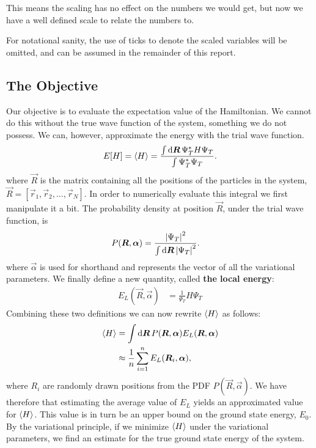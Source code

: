 \documentclass[a4paper, 11pt]{article}
\begin{document}
\begin{multicols}{2}
This means the scaling has no effect on the numbers we would get, but now we
have a well defined scale to relate the numbers to.

For notational sanity, the use of ticks to denote the scaled variables will be
omitted, and can be assumed in the remainder of this report. 



\subsection{The Objective}
Our objective is to evaluate the expectation value of the Hamiltonian. We cannot do this
without the true wave function of the system, something we do not possess.
We can, however, approximate the energy with the trial wave function.
\begin{align}
    E[H] = \expval{H} = \frac{\int \dd{\bm R} \Psi^*_T H \Psi_T}{\int
    \Psi_T^*\Psi_T}.
\end{align}
where $\vec R$ is the matrix containing all the positions of the particles in
the system, $\vec R = [\vec r_1, \vec r_2, \dots, \vec r_N]$.
In order to numerically evaluate this integral we first manipulate it a bit.
The probability density at position $\vec R$, under the trial wave function, is
\begin{align}
    P(\bm R, \bm \alpha) &= \frac{\abs{\Psi_T}^2}{\int \dd{\bm R}\abs{\Psi_T}^2}.
\end{align}
where $\vec \alpha$ is used for shorthand and represents the vector of all the variational parameters.
We finally define a new quantity, called \textbf{the local energy}:
\begin{align}
    E_L(\vec R, \vec \alpha) &= \frac{1}{\Psi_T}H\Psi_T\label{eq:E_L}
\end{align}
Combining these two definitions we can now rewrite $\expval{H}$ as follows:
\begin{align}
    \begin{split}
        \expval{H} &= \int \dd{\bm R} P(\bm R,\bm\alpha) E_L(\bm R,\bm\alpha)\\
        &\approx
        \frac{1}{n}\sum_{i=1}^n E_L(\bm R_i,\bm\alpha),
    \end{split}\label{eq:the-objective}
\end{align}
where $R_i$ are randomly drawn positions from the PDF $P(\vec R, \vec\alpha)$.
We have therefore that estimating the average value of $E_L$ yields an
approximated value for $\expval{H}$. This value is in turn be an upper bound on the
ground state energy, $E_0$. By the variational principle, if we minimize
$\expval{H}$ under the variational parameters, we find an estimate for the true
ground state energy of the system.


\end{multicols}
\end{document}
